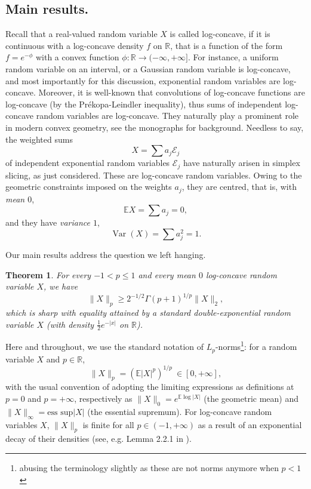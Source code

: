 \documentclass[10pt]{amsart}
\newcommand{\E}{\mathbb{E}}
\newcommand{\1}{\textbf{1}}
\newcommand{\R}{\mathbb{R}}
\newcommand{\red}{}
\newcommand{\cE}{\mathcal{E}}
\DeclareMathOperator{\Var}{Var}
\newtheorem{theorem}{Theorem}
\theoremstyle{remark}
\theoremstyle{definition}
\begin{document}
\subsection{Main results.}
Recall that a real-valued random variable $X$ is called log-concave, if it is continuous with a log-concave density $f$ on $\R$, that is a function of the form $f = e^{-\phi}$ with a convex function $\phi\colon \R \to (-\infty, +\infty]$. For instance, a uniform random variable on an interval, or a Gaussian random variable is log-concave, and most importantly for this discussion, exponential random variables are log-concave. Moreover, it is well-known that convolutions of log-concave functions are log-concave (by the Pr\'ekopa-Leindler inequality), thus sums of independent log-concave random variables are log-concave. They naturally play a prominent role in modern convex geometry, see the monographs \cite{AGM, BGVV} for background. Needless to say, the weighted sums 
\[
X = \sum a_j\cE_j
\]
of independent exponential random variables $\cE_j$ have naturally {\red arisen} in simplex slicing, as just considered. These are log-concave random variables. Owing to the geometric constraints imposed on the weights $a_j$, they are centred, {\red that is,} with \emph{mean $0$},
\[ 
\E X = \sum a_j = 0,
 \]
and they have \emph{variance $1$},
\[ 
\Var(X) = \sum a_j^2 = 1.
 \]


Our main results address the question we left hanging. 

\begin{theorem}\label{thm:Lp-L2}
For every $-1 < p \leq 1$ and every mean $0$ log-concave random variable $X$, we have
\[ 
\|X\|_p \geq 2^{-1/2}\Gamma(p+1)^{1/p}\|X\|_2,
 \]
which is sharp with equality attained by a standard double-exponential random variable $X$ (with density $\frac{1}{2}e^{-|x|}$ on $\R$).
\end{theorem}


Here and throughout, we use the standard notation of $L_p$-norms\footnote{abusing the terminology slightly as these are not norms anymore when $p < 1$}:  for a random variable $X$ and $p \in \R$, 
\[
\|X\|_p = (\E |X|^p)^{1/p} \ \in [0,+\infty],
\]
with the usual convention of adopting the limiting expressions as definitions at $p = 0$ and $p = +\infty$, respectively as $\|X\|_0 = e^{\E\log|X|}$ (the geometric mean) and $\|X\|_\infty = \text{ess sup} |X|$ (the essential supremum). For log-concave random variables $X$, $\|X\|_p$ is finite for all $p \in (-1, +\infty)$ as a result of an exponential decay of their densities (see, e.g. Lemma 2.2.1 in \cite{BGVV}).
\end{document}

